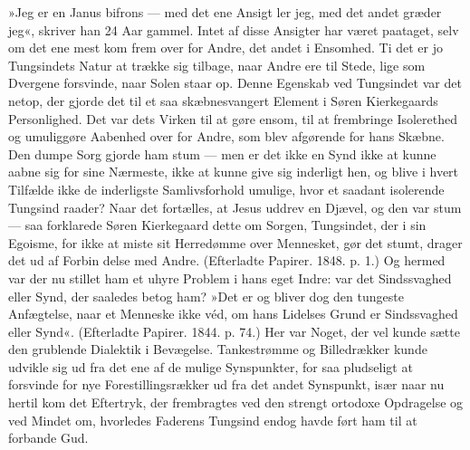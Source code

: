 \documentclass[12pt,a4paper,openany]{book}
\newcommand{\opage}[1]{\marginnote{\footnotesize\textit{[#1]}}}
\begin{document}
»Jeg er en Janus bifrons --- med det ene Ansigt ler
jeg, med det andet græder jeg«, skriver han 24 Aar
gammel. Intet af disse Ansigter har været paataget,
selv om det ene mest kom frem over for Andre, det
andet i Ensomhed. Ti det er jo Tungsindets Natur at
trække sig tilbage, naar Andre ere til Stede, lige som
Dvergene forsvinde, naar Solen staar op. Denne Egenskab
ved Tungsindet var det netop, der gjorde det til et
saa skæbnesvangert Element i Søren Kierkegaards Personlighed.
Det var dets Virken til at gøre ensom, til
at frembringe Isolerethed og umuliggøre Aabenhed over
for Andre, som blev afgørende for hans Skæbne. Den
dumpe Sorg gjorde ham stum --- men er det ikke en
Synd ikke at kunne aabne sig for sine Nærmeste, ikke
at kunne give sig inderligt hen, og blive i hvert Tilfælde
ikke de inderligste Samlivsforhold umulige, hvor et
saadant isolerende Tungsind raader? Naar det fortælles,
at Jesus uddrev en Djævel, og den var stum --- saa forklarede
Søren Kierkegaard dette om Sorgen, Tungsindet,
der i sin Egoisme, for ikke at miste sit Herredømme
over Mennesket, gør det stumt, drager det ud af Forbin%
\opage{35}delse med Andre. (Efterladte Papirer. 1848. p. 1.) Og
hermed var der nu stillet ham et uhyre Problem i hans
eget Indre: var det Sindssvaghed eller Synd, der saaledes
betog ham? »Det er og bliver dog den tungeste
Anfægtelse, naar et Menneske ikke véd, om hans Lidelses
Grund er Sindssvaghed eller Synd«. (Efterladte Papirer.
1844. p. 74.) Her var Noget, der vel kunde sætte den
grublende Dialektik i Bevægelse. Tankestrømme og
Billedrækker kunde udvikle sig ud fra det ene af de
mulige Synspunkter, for saa pludseligt at forsvinde for
nye Forestillingsrækker ud fra det andet Synspunkt, især
naar nu hertil kom det Eftertryk, der frembragtes ved den
strengt ortodoxe Opdragelse og ved Mindet om, hvorledes
Faderens Tungsind endog havde ført ham til at forbande
Gud.
\end{document}
